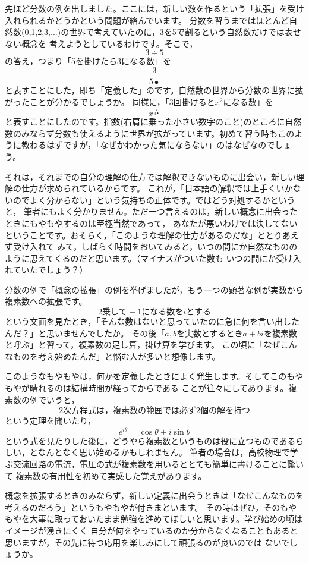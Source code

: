 \documentclass[./main]{subfiles}
\begin{document}
先ほど分数の例を出しました。ここには，新しい数を作るという「拡張」を受け入れられるかどうかという問題が絡んでいます。
分数を習うまではほとんど自然数(0,1,2,3,...)の世界で考えていたのに，3を5で割るという自然数だけでは表せない概念を
考えようとしているわけです。そこで，
\[
3 \div 5
\]の答え，つまり「5を掛けたら3になる数」を
\[
\frac{3}{5•}
\]
と表すことにした，即ち「定義した」のです。自然数の世界から分数の世界に拡がったことが分かるでしょうか。
同様に，「3回掛けると$x^2$になる数」を
\[
x^{\frac{2}{3•}}
\]
と表すことにしたのです。指数(右肩に乗った小さい数字のこと)のところに自然数のみならず分数も使えるように世界が拡がっています。初めて習う時もこのように教わるはずですが，「なぜかわかった気にならない」のはなぜなのでしょう。

それは，それまでの自分の理解の仕方では解釈できないものに出会い，新しい理解の仕方が求められているからです。
これが，「日本語の解釈では上手くいかないのでよく分からない」という気持ちの正体です。ではどう対処するかというと，
筆者にもよく分かりません。ただ一つ言えるのは，新しい概念に出会ったときにもやもやするのは至極当然であって，
あなたが悪いわけでは決してないということです。おそらく，「このような理解の仕方があるのだな」ととりあえず受け入れて
みて，しばらく時間をおいてみると，いつの間にか自然なもののように思えてくるのだと思います。（マイナスがついた数も
いつの間にか受け入れていたでしょう？）


分数の例で「概念の拡張」の例を挙げましたが，もう一つの顕著な例が実数から複素数への拡張です。
\[ 2乗して-1になる数をiとする\]
という文面を見たとき，「そんな数はないと思っていたのに急に何を言い出したんだ？」と思いませんでしたか。
その後「$a,b$を実数とするとき$a+bi$を複素数と呼ぶ」と習って，複素数の足し算，掛け算を学びます。
この頃に「なぜこんなものを考え始めたんだ」と悩む人が多いと想像します。

このようなもやもやは，何かを定義したときによく発生します。そしてこのもやもやが晴れるのは結構時間が経ってからである
ことが往々にしてあります。複素数の例でいうと，
\[
2次方程式は，複素数の範囲では必ず2個の解を持つ
\]
という定理を聞いたり，
\[
e^{i \theta} = \cos \theta + i \sin \theta
\]
という式を見たりした後に，どうやら複素数というものは役に立つものであるらしい，となんとなく思い始めるかもしれません。
筆者の場合は，高校物理で学ぶ交流回路の電流，電圧の式が複素数を用いるととても簡単に書けることに驚いて
複素数の有用性を初めて実感した覚えがあります。

概念を拡張するときのみならず，新しい定義に出会うときは「なぜこんなものを考えるのだろう」というもやもやが付きまといます。
その時はぜひ，そのもやもやを大事に取っておいたまま勉強を進めてほしいと思います。学び始めの頃はイメージが湧きにくく
自分が何をやっているのか分からなくなることもあると思いますが，その先に待つ応用を楽しみにして頑張るのが良いのでは
ないでしょうか。
\end{document}
